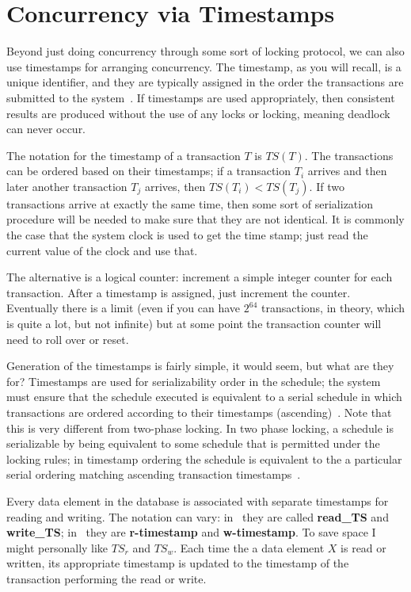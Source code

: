 




\section*{Concurrency via Timestamps}

Beyond just doing concurrency through some sort of locking protocol, we can also use timestamps for arranging concurrency. The timestamp, as you will recall, is a unique identifier, and they are typically assigned in the order the transactions are submitted to the system~\cite{fds}. If timestamps are used appropriately, then consistent results are produced without the use of any locks or locking, meaning deadlock can never occur.

The notation for the timestamp of a transaction $T$ is $T\!S(T)$. The transactions can be ordered based on their timestamps; if a transaction $T_{i}$ arrives and then later another transaction $T_{j}$ arrives, then $T\!S(T_{i}) < T\!S(T_{j})$. If two transactions arrive at exactly the same time, then some sort of serialization procedure will be needed to make sure that they are not identical. It is commonly the case that the system clock is used to get the time stamp; just read the current value of the clock and use that.

The alternative is a logical counter: increment a simple integer counter for each transaction. After a timestamp is assigned, just increment the counter. Eventually there is a limit (even if you can have $2^{64}$ transactions, in theory, which is quite a lot, but not infinite) but at some point the transaction counter will need to roll over or reset.

Generation of the timestamps is fairly simple, it would seem, but what are they for? Timestamps are used for serializability order in the schedule; the system must ensure that the schedule executed is equivalent to a serial schedule in which transactions are ordered according to their timestamps (ascending)~\cite{dsc}. Note that this is very different from two-phase locking. In two phase locking, a schedule is serializable by being equivalent to some schedule that is permitted under the locking rules; in timestamp ordering the schedule is equivalent to the a particular serial ordering matching ascending transaction timestamps~\cite{fds}.

Every data element in the database is associated with separate timestamps for reading and writing. The notation can vary: in~\cite{fds} they are called \textbf{read\_TS} and \textbf{write\_TS}; in~\cite{dsc} they are \textbf{r-timestamp} and \textbf{w-timestamp}. To save space I might personally like $T\!S_{r}$ and $T\!S_{w}$. Each time the a data element $X$ is read or written, its appropriate timestamp is updated to the timestamp of the transaction performing the read or write.

